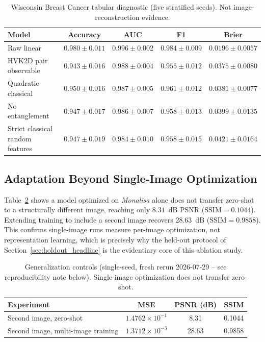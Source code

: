 \documentclass[11pt]{article}
\begin{document}
\begin{table}[H]
\centering
\caption{Wisconsin Breast Cancer tabular diagnostic (five stratified seeds). Not image-reconstruction evidence.}
\label{tab:wisconsin_diagnostic}
\scriptsize
\begin{tabular}{lcccc}
\toprule
Model & Accuracy & AUC & F1 & Brier \\
\midrule
Raw linear & $0.980{\pm}0.011$ & $0.996{\pm}0.002$ & $0.984{\pm}0.009$ & $0.0196{\pm}0.0057$ \\
HVK2D pair observable & $0.943{\pm}0.016$ & $0.988{\pm}0.004$ & $0.955{\pm}0.012$ & $0.0375{\pm}0.0080$ \\
Quadratic classical & $0.950{\pm}0.016$ & $0.987{\pm}0.005$ & $0.961{\pm}0.012$ & $0.0381{\pm}0.0077$ \\
No entanglement & $0.947{\pm}0.017$ & $0.986{\pm}0.007$ & $0.958{\pm}0.013$ & $0.0399{\pm}0.0135$ \\
Strict classical random features & $0.947{\pm}0.019$ & $0.984{\pm}0.010$ & $0.958{\pm}0.015$ & $0.0421{\pm}0.0164$ \\
\bottomrule
\end{tabular}
\end{table}

\subsection{Adaptation Beyond Single-Image Optimization}
Table~\ref{tab:generalization_controls} shows a model optimized on \textit{Monalisa} alone does not transfer zero-shot to a structurally different image, reaching only $8.31$~dB PSNR ($\mathrm{SSIM}=0.1044$). Extending training to include a second image recovers $28.63$~dB ($\mathrm{SSIM}=0.9858$). This confirms single-image runs measure per-image optimization, not representation learning, which is precisely why the held-out protocol of Section~\ref{sec:holdout_headline} is the evidentiary core of this ablation study.

\begin{table}[H]
\centering
\caption{Generalization controls (single-seed, fresh rerun 2026-07-29 -- see reproducibility note below). Single-image optimization does not transfer zero-shot.}
\label{tab:generalization_controls}
\scriptsize
\begin{tabular}{lccc}
\toprule
Experiment & MSE & PSNR (dB) & SSIM \\
\midrule
Second image, zero-shot & $1.4762\times10^{-1}$ & 8.31 & 0.1044 \\
Second image, multi-image training & $1.3712\times10^{-3}$ & 28.63 & 0.9858 \\
\bottomrule
\end{tabular}
\end{table}
\end{document}
